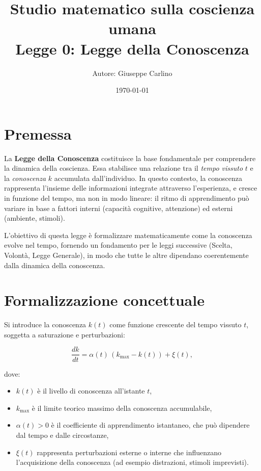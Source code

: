 \documentclass[12pt,a4paper]{article}
\title{\centering Studio matematico sulla coscienza umana \\ Legge 0: Legge della Conoscenza}
\author{Autore: Giuseppe Carlino}
\date{\today}
\begin{document}
\maketitle

\section{Premessa}

La \textbf{Legge della Conoscenza} costituisce la base fondamentale per comprendere la dinamica della coscienza. Essa stabilisce una relazione tra il \textit{tempo vissuto} $t$ e la \textit{conoscenza} $k$ accumulata dall’individuo. In questo contesto, la conoscenza rappresenta l’insieme delle informazioni integrate attraverso l’esperienza, e cresce in funzione del tempo, ma non in modo lineare: il ritmo di apprendimento può variare in base a fattori interni (capacità cognitive, attenzione) ed esterni (ambiente, stimoli).

L’obiettivo di questa legge è formalizzare matematicamente come la conoscenza evolve nel tempo, fornendo un fondamento per le leggi successive (Scelta, Volontà, Legge Generale), in modo che tutte le altre dipendano coerentemente dalla dinamica della conoscenza.

\section{Formalizzazione concettuale}

Si introduce la conoscenza $k(t)$ come funzione crescente del tempo vissuto $t$, soggetta a saturazione e perturbazioni:

\begin{equation}
\frac{dk}{dt} = \alpha(t)\,(k_{\max}-k(t)) + \xi(t),
\end{equation}

dove:
\begin{itemize}
    \item $k(t)$ è il livello di conoscenza all’istante $t$,
    \item $k_{\max}$ è il limite teorico massimo della conoscenza accumulabile,
    \item $\alpha(t)>0$ è il coefficiente di apprendimento istantaneo, che può dipendere dal tempo e dalle circostanze,
    \item $\xi(t)$ rappresenta perturbazioni esterne o interne che influenzano l’acquisizione della conoscenza (ad esempio distrazioni, stimoli imprevisti).
\end{itemize}
\end{document}
